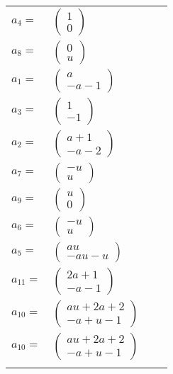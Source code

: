 \documentclass[1p]{elsarticle_modified}
\theoremstyle{definition}
\begin{document}
\begin{tabular}{m{7pt} m{180pt} m{7pt} m{180pt} }
\flushright $a_{4}=$&$\begin{pmatrix}1\\0\end{pmatrix}$ \\
\flushright $a_{8}=$&$\begin{pmatrix}0\\u\end{pmatrix}$ \\
\flushright $a_{1}=$&$\begin{pmatrix}a\\- a-1\end{pmatrix}$ \\
\flushright $a_{3}=$&$\begin{pmatrix}1\\-1\end{pmatrix}$ \\
\flushright $a_{2}=$&$\begin{pmatrix}a+1\\- a-2\end{pmatrix}$ \\
\flushright $a_{7}=$&$\begin{pmatrix}- u\\u\end{pmatrix}$ \\
\flushright $a_{9}=$&$\begin{pmatrix}u\\0\end{pmatrix}$ \\
\flushright $a_{6}=$&$\begin{pmatrix}- u\\u\end{pmatrix}$ \\
\flushright $a_{5}=$&$\begin{pmatrix}a u\\- a u- u\end{pmatrix}$ \\
\flushright $a_{11}=$&$\begin{pmatrix}2 a+1\\- a-1\end{pmatrix}$ \\
\flushright $a_{10}=$&$\begin{pmatrix}a u+2 a+2\\- a+u-1\end{pmatrix}$\\ \flushright $a_{10}=$&$\begin{pmatrix}a u+2 a+2\\- a+u-1\end{pmatrix}$\\&\end{tabular}
\end{document}
